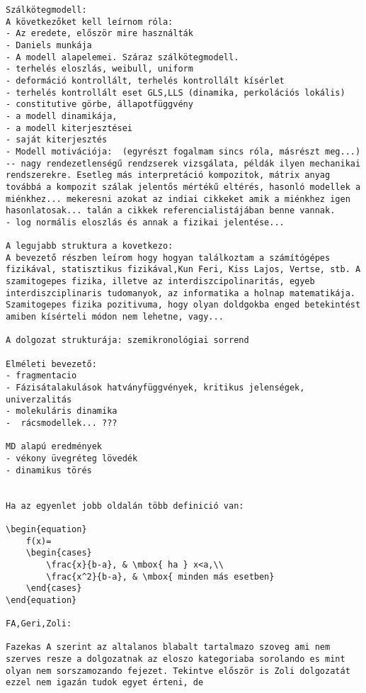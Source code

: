 \begin{verbatim}
Szálkötegmodell: 
A következőket kell leírnom róla:
- Az eredete, először mire használták
- Daniels munkája
- A modell alapelemei. Száraz szálkötegmodell. 
- terhelés eloszlás, weibull, uniform
- deformáció kontrollált, terhelés kontrollált kísérlet
- terhelés kontrollált eset GLS,LLS (dinamika, perkolációs lokális)
- constitutive görbe, állapotfüggvény
- a modell dinamikája,
- a modell kiterjesztései
- saját kiterjesztés
- Modell motivációja:  (egyrészt fogalmam sincs róla, másrészt meg...)
-- nagy rendezetlenségű rendzserek vizsgálata, példák ilyen mechanikai rendszerekre. Esetleg más interpretáció kompozitok, mátrix anyag továbbá a kompozit szálak jelentős mértékű eltérés, hasonló modellek a miénkhez... mekeresni azokat az indiai cikkeket amik a miénkhez igen hasonlatosak... talán a cikkek referencialistájában benne vannak.
- log normális eloszlás és annak a fizikai jelentése...

A legujabb struktura a kovetkezo:
A bevezető részben leírom hogy hogyan találkoztam a számítógépes fizikával, statisztikus fizikával,Kun Feri, Kiss Lajos, Vertse, stb. A szamitogepes fizika, illetve az interdiszcipolinaritás, egyeb interdiszciplinaris tudomanyok, az informatika a holnap matematikája. 
Szamitogepes fizika pozitivuma, hogy olyan doldgokba enged betekintést amiben kísérteli módon nem lehetne, vagy...

A dolgozat strukturája: szemikronológiai sorrend

Elméleti bevezető:
- fragmentacio
- Fázisátalakulások hatványfüggvények, kritikus jelenségek, univerzalitás
- molekuláris dinamika
-  rácsmodellek... ???

MD alapú eredmények
- vékony üvegréteg lövedék
- dinamikus törés


Ha az egyenlet jobb oldalán több definició van:

\begin{equation}
	f(x)=
	\begin{cases} 
		\frac{x}{b-a}, & \mbox{ ha } x<a,\\
		\frac{x^2}{b-a}, & \mbox{ minden más esetben}
	\end{cases}
\end{equation}

FA,Geri,Zoli:

Fazekas A szerint az altalanos blabalt tartalmazo szoveg ami nem szerves resze a dolgozatnak az eloszo kategoriaba sorolando es mint olyan nem sorszamozando fejezet. Tekintve először is Zoli dolgozatát ezzel nem igazán tudok egyet érteni, de 


\end{verbatim}
